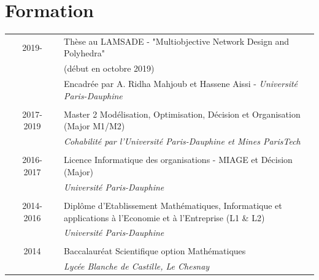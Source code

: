 \documentclass[a4paper,10pt]{article}
\begin{document}
\section{Formation}
\begin{tabular}{p{0.06cm} c p{0.04cm}|p{13cm}}
 & \textsc{2019-} & & Thèse au LAMSADE - "Multiobjective Network Design and Polyhedra" \\
 &&& (début en octobre 2019) \\
 &&& \small{Encadrée par A. Ridha Mahjoub et Hassene Aissi - \emph{Université Paris-Dauphine}}\\\multicolumn{2}{c}{} \\
 & \textsc{2017-2019} & & Master 2 Modélisation, Optimisation, Décision et Organisation (Major M1/M2)\\&&&\emph{\small{Cohabilité par l'Université Paris-Dauphine et Mines ParisTech}}\\\multicolumn{2}{c}{} \\
 & \textsc{2016-2017} & & Licence Informatique des organisations - MIAGE et Décision (Major)\\&&&\emph{\small{Université Paris-Dauphine}}\\\multicolumn{2}{c}{} \\
 & \textsc{2014-2016} & & Diplôme d'Etablissement Mathématiques, Informatique et applications à l'Economie et à l'Entreprise (L1 \& L2) \\&&&\emph{\small{Université Paris-Dauphine}}\\\multicolumn{2}{c}{} \\
 &\textsc{2014} & & Baccalauréat Scientifique option Mathématiques \\&&&\emph{\small{Lycée Blanche de Castille, Le Chesnay}}\\
\end{tabular}
\titlespacing{\section}{0pt}{2pt}{2pt}
\end{document}
